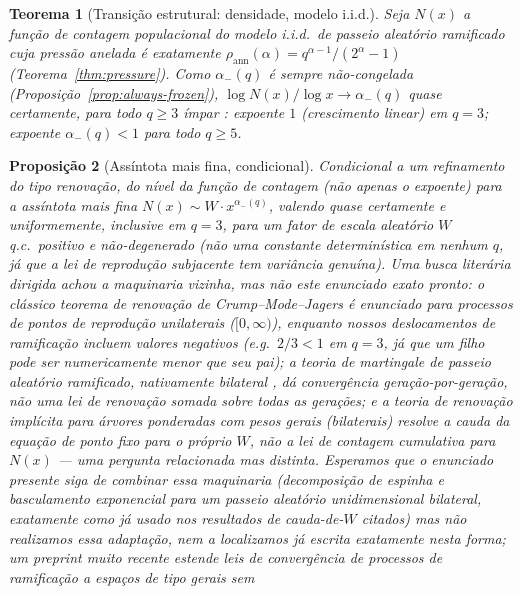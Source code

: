 \documentclass[11pt]{article}
\newtheorem{theorem}{Teorema}[section]
\newtheorem{proposition}[theorem]{Proposição}
\theoremstyle{definition}
\theoremstyle{remark}
\begin{document}
\begin{theorem}[Transição estrutural: densidade, modelo i.i.d.]\label{thm:transition-model}
Seja $N(x)$ a função de contagem populacional do modelo i.i.d.\ de
passeio aleatório ramificado cuja pressão anelada é exatamente
$\rho_{\mathrm{ann}}(\alpha)=q^{\alpha-1}/(2^\alpha-1)$
(Teorema~\ref{thm:pressure}). Como $\alpha_-(q)$ é sempre não-congelada
(Proposição~\ref{prop:always-frozen}), $\log N(x)/\log x\to\alpha_-(q)$
quase certamente, para todo $q\ge3$ ímpar \cite{Biggins1992}: expoente
$1$ (crescimento linear) em $q=3$; expoente $\alpha_-(q)<1$ para todo
$q\ge5$.
\end{theorem}

\begin{proposition}[Assíntota mais fina, condicional]\label{prop:transition-fine}
Condicional a um refinamento do tipo renovação, do nível da função de
contagem (não apenas o expoente) para a assíntota mais fina
$N(x)\sim W\cdot x^{\alpha_-(q)}$, valendo quase certamente e
uniformemente, \emph{inclusive} em $q=3$, para um fator de escala
aleatório $W$ q.c.\ positivo e não-degenerado (não uma constante
determinística em nenhum $q$, já que a lei de reprodução subjacente
tem variância genuína). Uma busca literária dirigida achou a
maquinaria vizinha, mas não este enunciado exato pronto: o clássico
teorema de renovação de Crump--Mode--Jagers \cite{Nerman1981} é
enunciado para processos de pontos de reprodução unilaterais
($[0,\infty)$), enquanto nossos deslocamentos de ramificação incluem
valores negativos (e.g.\ $2/3<1$ em $q=3$, já que um filho pode ser
numericamente menor que seu pai); a teoria de martingale de passeio
aleatório ramificado, nativamente bilateral \cite{Biggins1992}, dá
convergência geração-por-geração, não uma lei de renovação somada
sobre todas as gerações; e a teoria de renovação implícita para
árvores ponderadas com pesos gerais (bilaterais)
\cite{Goldie1991,JelenkovicOlveraCravioto2012,AlsmeyerBigginsMeiners2012}
resolve a \emph{cauda} da equação de ponto fixo para o próprio $W$, não
a lei de contagem cumulativa para $N(x)$ --- uma pergunta relacionada
mas distinta. Esperamos que o enunciado presente siga de combinar essa
maquinaria (decomposição de espinha e basculamento exponencial para um
passeio aleatório unidimensional bilateral, exatamente como já usado
nos resultados de cauda-de-$W$ citados) mas não realizamos essa
adaptação, nem a localizamos já escrita exatamente nesta forma; um
preprint muito recente \cite{VillemonaisZalduendo2025} estende leis de
convergência de processos de ramificação a espaços de tipo gerais sem

\end{proposition}
\end{document}
